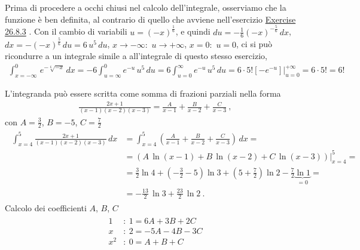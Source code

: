 \documentclass[letterpaper,10pt,italian]{jupyterBook}
\begin{document}
\sphinxAtStartPar
{} Prima di procedere a occhi chiusi nel calcolo dell’integrale, osserviamo che la funzione è ben definita, al contrario di quello che avviene nell’esercizio \hyperref[exercise:ex:integrals:definite:attention]{Exercise 26.8.3} . Con il cambio di variabili \(u = (-x)^{\frac{1}{6}}\), e quindi \(du = - \frac{1}{6}(-x)^{-\frac{5}{6}} \, dx\), \(dx = - (-x)^{\frac{5}{6}} \, du = 6 \, u^5 \, du\), \(x \rightarrow -\infty:\) \(u \rightarrow +\infty\), \(x = 0:\) \(u = 0\),  ci si può ricondurre a un integrale simile a all’integrale  di questo stesso esercizio,
\begin{equation*}
\begin{split}\int_{x=-\infty}^{0} \, e^{-\sqrt[6]{-x}} \, dx = - 6 \int_{u=\infty}^{0} e^{-u} \, u^5 \, du = 6 \int_{u=0}^{\infty} e^{-u} \, u^5 \, du = 6 \cdot 5! \left. \left[ - e^{-u} \right]\right|_{u=0}^{+\infty} = 6 \cdot 5! = 6!\end{split}
\end{equation*}


\sphinxAtStartPar
{}

\sphinxAtStartPar
{} L’integranda può essere scritta come somma di frazioni parziali nella forma
\begin{equation*}
\begin{split}\frac{2x+1}{(x-1)(x-2)(x-3)} = \frac{A}{x-1} + \frac{B}{x-2} + \frac{C}{x-3} \ ,\end{split}
\end{equation*}
\sphinxAtStartPar
con \(A = \frac{3}{2}\), \(B = -5\), \(C = \frac{7}{2}\)
\begin{equation*}
\begin{split}\begin{aligned}
  \int_{x=4}^{5} \frac{2x+1}{(x-1)(x-2)(x-3)} \, dx
  & = \int_{x=4}^{5} \left( \frac{A}{x-1} + \frac{B}{x-2} + \frac{C}{x-3} \right) \, dx = \\
  & = \left( A \,\ln(x-1) + B \, \ln(x-2) + C \, \ln(x-3) \right)|_{x=4}^{5}  = \\
  & = \frac{3}{2} \ln 4 + \left( - \frac{3}{2} - 5  \right) \ln 3 + \left( 5 + \frac{7}{2} \right) \ln 2 - \frac{7}{2} \underbrace{\ln 1}_{=0} = \\
  & = - \frac{13}{2} \, \ln 3 + \frac{23}{2} \, \ln 2 \ .
\end{aligned}\end{split}
\end{equation*}
\sphinxAtStartPar
Calcolo dei coefficienti \(A\), \(B\), \(C\)  
\begin{equation*}
\begin{split}\begin{aligned}
  1   & : \ 1 = 6A + 3B+ 2C \\ 
  x   & : \ 2 = -5A - 4B - 3C \\ 
  x^2 & : \ 0 = A + B + C \\ 
\end{aligned}\end{split}
\end{equation*}
\sphinxAtStartPar
{}
\end{document}
